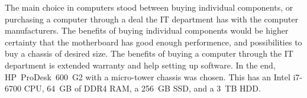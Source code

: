 \documentclass[../main/thesis.tex]{subfiles}
\begin{document}
The main choice in computers stood between buying individual components, or purchasing a computer through a deal the IT department has with the computer manufacturers. The benefits of buying individual components would be higher certainty that the motherboard has good enough performence, and possibilities to buy a chassis of desired size. The benefits of buying a computer through the IT department is extended warranty and help setting up software. In the end, HP~ProDesk~600~G2 with a micro-tower chassis was chosen. This has an Intel i7-6700 CPU, 64~GB of DDR4 RAM, a 256~GB SSD, and a 3~TB HDD. 
\end{document}
